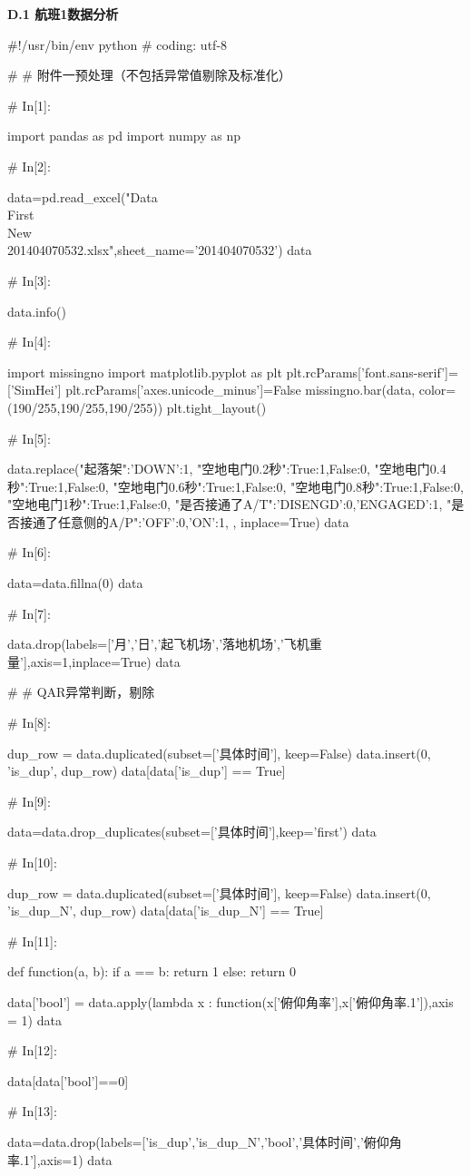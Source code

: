 \documentclass{MathorCupModeling}
\begin{document}
\textbf{D.1 航班1数据分析}
\begin{python}
#!/usr/bin/env python
# coding: utf-8

# # 附件一预处理（不包括异常值剔除及标准化）

# In[1]:


import pandas as pd
import numpy as np


# In[2]:


data=pd.read_excel("Data\\First\\New\\201404070532.xlsx",sheet_name='201404070532')
data


# In[3]:


data.info()


# In[4]:


import missingno
import matplotlib.pyplot as plt
plt.rcParams['font.sans-serif']=['SimHei']
plt.rcParams['axes.unicode_minus']=False
missingno.bar(data, color=(190/255,190/255,190/255))
plt.tight_layout()


# In[5]:


data.replace({"起落架":{'DOWN':1},
              "空地电门0.2秒":{True:1,False:0},
              "空地电门0.4秒":{True:1,False:0},
              "空地电门0.6秒":{True:1,False:0},
              "空地电门0.8秒":{True:1,False:0},
              "空地电门1秒":{True:1,False:0},
              "是否接通了A/T":{'DISENGD':0,'ENGAGED':1},
              "是否接通了任意侧的A/P":{'OFF':0,'ON':1},
              }, inplace=True)
data


# In[6]:


data=data.fillna(0)
data


# In[7]:


data.drop(labels=['月','日','起飞机场','落地机场','飞机重量'],axis=1,inplace=True)
data


# # QAR异常判断，剔除

# In[8]:


dup_row = data.duplicated(subset=['具体时间'], keep=False)
data.insert(0, 'is_dup', dup_row)
data[data['is_dup'] == True]


# In[9]:


data=data.drop_duplicates(subset=['具体时间'],keep='first')
data


# In[10]:


dup_row = data.duplicated(subset=['具体时间'], keep=False)
data.insert(0, 'is_dup_N', dup_row)
data[data['is_dup_N'] == True]


# In[11]:


def function(a, b):
    if a == b:
        return 1
    else:
        return 0


data['bool'] = data.apply(lambda x : function(x['俯仰角率'],x['俯仰角率.1']),axis = 1)
data


# In[12]:


data[data['bool']==0]


# In[13]:


data=data.drop(labels=['is_dup','is_dup_N','bool','具体时间','俯仰角率.1'],axis=1)
data


\end{python}
\end{document}
